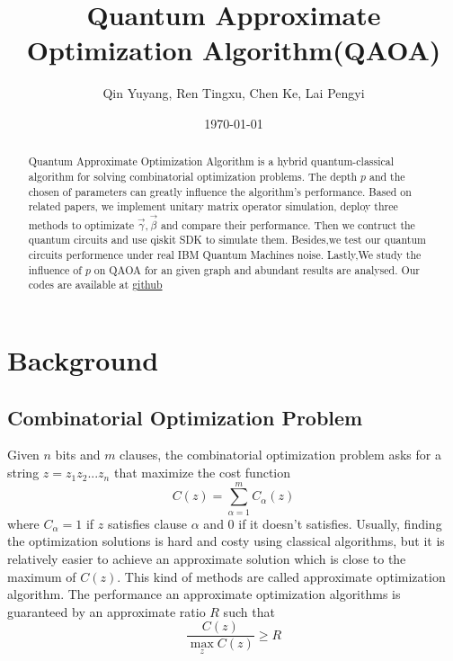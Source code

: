 \documentclass{./source/Report}
\begin{document}
\title{Quantum Approximate Optimization Algorithm(QAOA)}

\author{Qin Yuyang, Ren Tingxu, Chen Ke, Lai Pengyi}

\date{\today}

\begin{abstract}
Quantum Approximate Optimization Algorithm is a hybrid quantum-classical algorithm for solving combinatorial optimization problems. The depth $p$ and the chosen of parameters can greatly influence the algorithm's performance. Based on related papers, we implement unitary matrix operator simulation, deploy three methods to optimizate $\vec{\gamma}, \vec{\beta}$ and compare their performance. Then we contruct the quantum circuits and use qiskit SDK to simulate them. Besides,we test  our quantum circuits performence under real IBM Quantum Machines noise. Lastly,We study the influence of $p$ on QAOA for an given graph and abundant results are analysed. Our codes are available at  \href{https://github.com/qyy2003/QAOA}{github}
\end{abstract}

\maketitle

\section{Background}
\subsection{Combinatorial Optimization Problem}
Given $n$ bits and $m$ clauses, the combinatorial optimization problem asks for a string $z=z_1z_2...z_n$ that maximize the cost function 
\begin{equation}
  C(z) = \sum_{\alpha=1}^mC_{\alpha}(z)
\end{equation}
where $C_{\alpha}=1$ if $z$ satisfies clause $\alpha$ and $0$ if it doesn't satisfies.
Usually, finding the optimization solutions is hard and costy using classical algorithms, but it is relatively 
easier to achieve an approximate solution which is close to the maximum of $C(z)$. This kind of methods are called 
approximate optimization algorithm.  The performance an approximate optimization algorithms is guaranteed by an approximate ratio $R$
such that 
\begin{equation}
    \frac{C(z)}{\max_{z}C(z)}\ge R
\end{equation}
\end{document}
